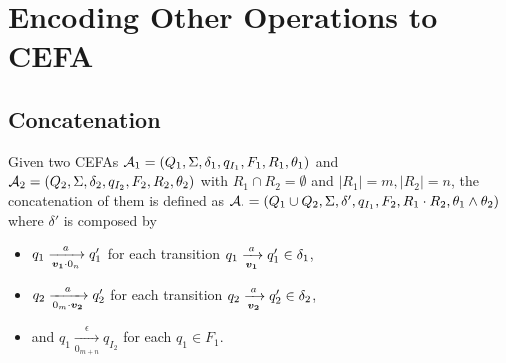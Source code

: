 \section{Encoding Other Operations to CEFA} \label{appendix:cefa}

\subsection{Concatenation}\label{subsec:con}
Given two CEFAs $\mathcal{A}_1 = (Q_1, \Sigma, \delta_1, q_{I_1}, F_1, R_1, \theta_1)$ and $\mathcal{A}_2 = (Q_2, \Sigma, \delta_2, q_{I_2}, F_2, R_2, \theta_2)$ with $R_1\cap R_2= \emptyset$ and $|R_1|=m,|R_2|=n$, the concatenation of them is defined as $\mathcal{A}_{\cdot}=(Q_1\cup Q_2, \Sigma, \delta', q_{I_1}, F_2, R_1\cdot R_2, \theta_1\wedge\theta_2)$ where $\delta'$ is composed by
\begin{itemize}
  \item $q_1\xrightarrow[\myvec{v_1}\cdot 0_n]{a} q_1'$ for each transition $q_1\xrightarrow[\myvec{v_1}]{a} q_1' \in \delta_1$,
  \item $q_2\xrightarrow[0_m\cdot\myvec{v_2}]{a} q_2'$ for each transition $q_2\xrightarrow[\myvec{v_2}]{a} q_2' \in \delta_2$,
  \item and $q_1\xrightarrow[0_{m+n}]{\epsilon} q_{I_2}$ for each $q_1\in F_1$.
\end{itemize}
